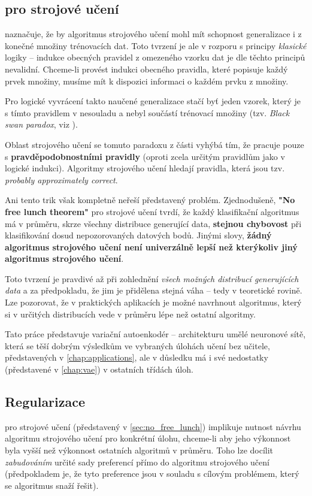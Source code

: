 \subsection{ pro strojové učení}
\label{sec:no_free_lunch}
\textcite{Vapnik2000} naznačuje, že by algoritmus strojového učení mohl mít schopnost generalizace i z konečné množiny trénovacích dat. 
Toto tvrzení je ale v rozporu s principy \emph{klasické} logiky – indukce obecných pravidel \cite{Hume1978} z omezeného vzorku dat je dle těchto principů nevalidní.
Chceme-li provést indukci obecného pravidla, které popisuje každý prvek množiny, musíme mít k dispozici informaci o každém prvku z množiny.  \cite{Goodfellow2016}

Pro logické vyvrácení takto naučené generalizace stačí byť jeden vzorek, který je s tímto pravidlem v nesouladu a nebyl součástí trénovací množiny (tzv. \emph{Black swan paradox}, viz \textcite{Taleb2008}).

Oblast strojového učení se tomuto paradoxu z části vyhýbá tím, že pracuje pouze s \textbf{pravděpodobnostními pravidly} (oproti zcela určitým pravidlům jako v logické indukci).
Algoritmy strojového učení hledají pravidla, která jsou tzv. \emph{probably approximately correct}. \cite{Valiant1984}

Ani tento trik však kompletně neřeší představený problém. Zjednodušeně, \textbf{"No free lunch theorem"} pro strojové učení tvrdí, že každý klasifikační algoritmus má v průměru, skrze všechny distribuce generující data, \textbf{stejnou chybovost} při klasifikování dosud nepozorovaných datových bodů. \cite{Wolpert1996}
Jinými slovy, \textbf{žádný algoritmus strojového učení není univerzálně lepší než kterýkoliv jiný algoritmus strojového učení}.

Toto tvrzení je pravdivé až při zohlednění \emph{všech možných distribucí generujících data} a za předpokladu, že jim je přidělena stejná váha \cite{Hibbard2009} – tedy v teoretické rovině.
Lze pozorovat, že v praktických aplikacích je možné navrhnout algoritmus, který si v určitých distribucích vede v průměru lépe než ostatní algoritmy. \cite{Goodfellow2016}

Tato práce představuje variační autoenkodér – architekturu umělé neuronové sítě, která se těší dobrým výsledkům ve vybraných úlohách učení bez učitele, představených v \autoref{chap:applications}, ale v důsledku má i své nedostatky (představené v \autoref{chap:vae}) v ostatních třídách úloh.

\subsection{Regularizace}
\label{sec:regularization}
 pro strojové učení (představený v \autoref{sec:no_free_lunch}) implikuje nutnost návrhu algoritmu strojového učení pro konkrétní úlohu, chceme-li aby jeho výkonnost byla vyšší než výkonnost ostatních algoritmů v průměru.
Toho lze docílit \emph{zabudováním} určité sady preferencí přímo do algoritmu strojového učení (předpokladem je, že tyto preference jsou v souladu s cílovým problémem, který se algoritmus snaží řešit). \cite{Goodfellow2016}


